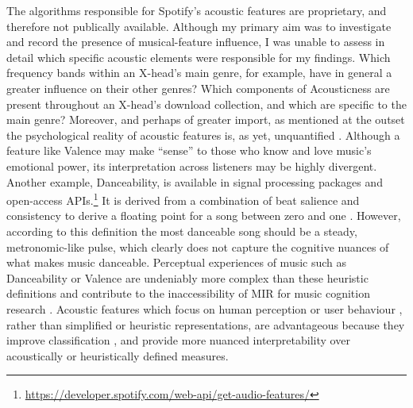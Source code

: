 \documentclass[a4paper]{article}
\begin{document}
The algorithms responsible for Spotify's acoustic features are proprietary, and therefore not publically available. Although my primary aim was to investigate and record the presence of musical-feature influence, I was unable to assess in detail which specific acoustic elements were responsible for my findings. Which frequency bands within an X-head’s main genre, for example, have in general a greater influence on their other genres? Which components of Acousticness are present throughout an X-head’s download collection, and which are specific to the main genre? Moreover, and perhaps of greater import, as mentioned at the outset the psychological reality of acoustic features is, as yet, unquantified \cite{friberg2014using}. Although a feature like Valence may make “sense” to those who know and love music’s emotional power, its interpretation across listeners may be highly divergent. Another example, Danceability, is available in signal processing packages \cite{bogdanov2013essentia,Bogdanov2009FromMeasures} and open-access \Gls{API}s.\footnote{\url{https://developer.spotify.com/web-api/get-audio-features/}} It is derived from a combination of beat salience and consistency to derive a floating point for a song between zero and one \cite{streich2005detrended}. However, according to this definition the most danceable song should be a steady, metronomic-like pulse, which clearly does not capture the cognitive nuances of what makes music danceable. Perceptual experiences of music such as Danceability or Valence are undeniably more complex than these heuristic definitions and contribute to the inaccessibility of MIR for music cognition research \cite{aucouturier2012mel}. Acoustic features which focus on human perception \cite{friberg2014using} or user behaviour \cite{vigliensoni2016automatic}, rather than simplified or heuristic representations, are advantageous because they improve classification \cite{Chen2001,mckay2010evaluating,lippens2004comparison}, and provide more nuanced interpretability over acoustically or heuristically defined measures.
\end{document}
